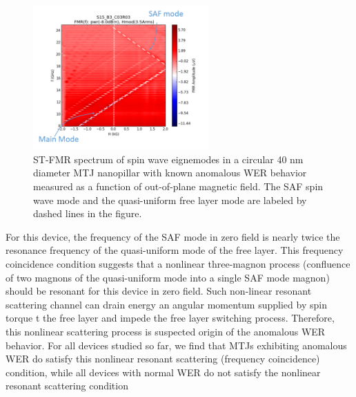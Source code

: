 \begin{figure}[h!]
  \centering
  \includegraphics[width=0.6\textwidth]{fig/FieldMod/FMR-WER.png}
   \caption{ST-FMR spectrum of spin wave eignemodes in a circular 40 nm diameter MTJ nanopillar with known anomalous WER behavior measured as a function of out-of-plane magnetic field. The SAF spin wave mode and the quasi-uniform free layer mode are labeled by dashed lines in the figure.}
  \label{fig:WERSTFMR}
\end{figure}


For this device, the frequency of the SAF mode in zero field is nearly twice the resonance frequency of the quasi-uniform mode of the free layer. This frequency coincidence condition suggests that a nonlinear three-magnon process (confluence of two magnons of the quasi-uniform mode into a single SAF mode magnon) should be resonant for this device in zero field. Such non-linear resonant scattering channel can drain energy an angular momentum supplied by spin torque t the free layer and impede the free layer switching process. Therefore, this nonlinear scattering process is suspected origin of the anomalous WER behavior. For all devices studied so far, we find that MTJs exhibiting anomalous WER do satisfy this nonlinear resonant scattering (frequency coincidence) condition, while all devices with normal WER do not satisfy the nonlinear resonant scattering condition